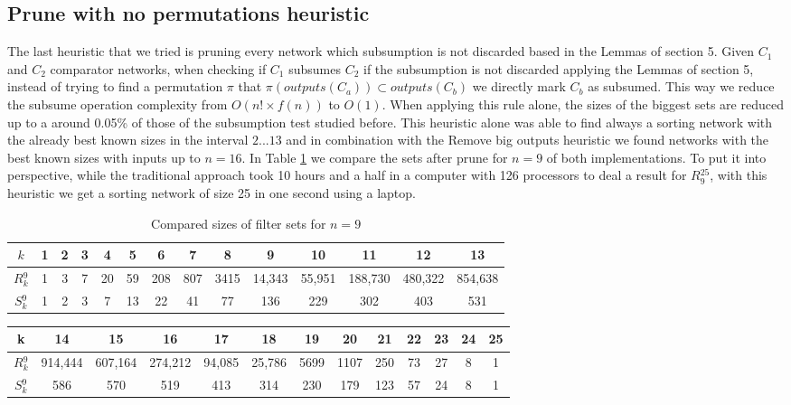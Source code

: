 \documentclass[../main.tex]{subfiles}
\begin{document}
	\subsection{Prune with no permutations heuristic} \label{noPermutationsHeuristic}
	The last heuristic that we tried is pruning every network which subsumption is not discarded based in the Lemmas of section 5. Given $C_1$ and $C_2$ comparator networks, when checking if $C_1$ subsumes $C_2$ if the subsumption is not discarded applying the Lemmas of section 5, instead of trying to find a permutation $\pi$ that $\pi(outputs(C_a)) \subset outputs(C_b)$ we directly mark $C_b$ as subsumed. This way we reduce the subsume operation complexity from $O(n! \times f(n))$ to $O(1)$. When applying this rule alone, the sizes of the biggest sets are reduced up to a around 0.05\% of those of the subsumption test studied before. This heuristic alone was able to find always a sorting network with the already best known sizes in the interval $2...13$ and in combination with the Remove big outputs heuristic we found networks with the best known sizes with inputs up to $n=16$. In Table \ref{table:noPermutations} we compare the sets after prune for $n=9$ of both implementations. To put it into perspective, while the traditional approach took 10 hours and a half in a computer with 126 processors to deal a result for $R{_9^{25}}$, with this heuristic we get a sorting network of size 25 in one second using a laptop.  
	
	\begin{table}[H]
		\hspace*{-1cm}
		\begin{tabular}{|c c c c c c c c c c c c c c|}
			\hline
			$k$ & 1 & 2 & 3 & 4 & 5 & 6 & 7 & 8 & 9 & 10 & 11 & 12 & 13  \\
			\hline\hline
			$R{^9_k}$& 1 & 3 & 7 & 20 & 59 & 208 & 807 & 3415 & 14,343 & 55,951 & 188,730 & 480,322 & 854,638 \\ 
			\hline
			$S{^9_k}$ & 1 & 2 & 3 & 7 & 13 & 22 & 41 & 77 & 136 & 229 & 302 & 403 & 531 \\
			\hline
		\end{tabular}
		\caption{Compared sizes of filter sets for $n=9$}
		\label{table:noPermutations}
	\end{table}
	\begin{table}[H]
		\hspace*{-1cm}
		\begin{tabular}{|c c c c c c c c c c c c c|}
			\hline
			k & 14 & 15 & 16 & 17 & 18 & 19 & 20 & 21 & 22 & 23 & 24 & 25  \\
			\hline\hline
			$R{^9_k}$ & 914,444 & 607,164 & 274,212 & 94,085 & 25,786 & 5699 & 1107 & 250 & 73 & 27 & 8 & 1 \\ 
			\hline
			$S{^9_k}$ & 586 & 570 & 519 & 413 & 314 & 230 & 179 & 123 & 57 & 24 & 8 & 1 \\
			\hline
		\end{tabular}
	\end{table}
	
\end{document}
